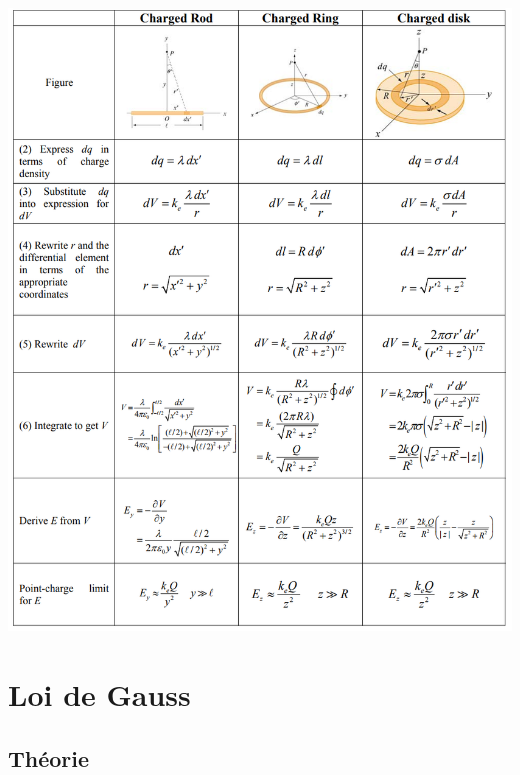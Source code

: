 \documentclass[a4paper]{article}
\begin{document}
\begin{center}
\includegraphics[width=\textwidth]{ExemplesPotElec.PNG}
\end{center}
















\section{Loi de Gauss}








\subsection{Théorie}
\end{document}
